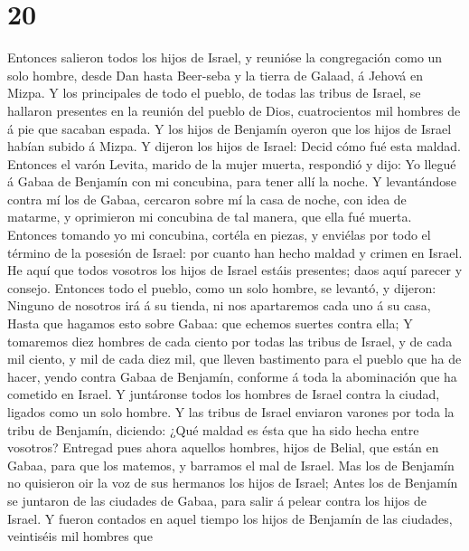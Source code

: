 \hypertarget{section-19}{%
\section{20}\label{section-19}}

 Entonces salieron todos los hijos de Israel, y reunióse
la congregación como un solo hombre, desde Dan hasta Beer-seba y la
tierra de Galaad, á Jehová en Mizpa.  Y los principales de
todo el pueblo, de todas las tribus de Israel, se hallaron presentes en
la reunión del pueblo de Dios, cuatrocientos mil hombres de á pie que
sacaban espada.  Y los hijos de Benjamín oyeron que los
hijos de Israel habían subido á Mizpa. Y dijeron los hijos de Israel:
Decid cómo fué esta maldad.  Entonces el varón Levita,
marido de la mujer muerta, respondió y dijo: Yo llegué á Gabaa de
Benjamín con mi concubina, para tener allí la noche.  Y
levantándose contra mí los de Gabaa, cercaron sobre mí la casa de noche,
con idea de matarme, y oprimieron mi concubina de tal manera, que ella
fué muerta.  Entonces tomando yo mi concubina, cortéla en
piezas, y enviélas por todo el término de la posesión de Israel: por
cuanto han hecho maldad y crimen en Israel.  He aquí que
todos vosotros los hijos de Israel estáis presentes; daos aquí parecer y
consejo.  Entonces todo el pueblo, como un solo hombre, se
levantó, y dijeron: Ninguno de nosotros irá á su tienda, ni nos
apartaremos cada uno á su casa,  Hasta que hagamos esto
sobre Gabaa: que echemos suertes contra ella;  Y
tomaremos diez hombres de cada ciento por todas las tribus de Israel, y
de cada mil ciento, y mil de cada diez mil, que lleven bastimento para
el pueblo que ha de hacer, yendo contra Gabaa de Benjamín, conforme á
toda la abominación que ha cometido en Israel.  Y
juntáronse todos los hombres de Israel contra la ciudad, ligados como un
solo hombre.  Y las tribus de Israel enviaron varones por
toda la tribu de Benjamín, diciendo: ¿Qué maldad es ésta que ha sido
hecha entre vosotros?  Entregad pues ahora aquellos
hombres, hijos de Belial, que están en Gabaa, para que los matemos, y
barramos el mal de Israel. Mas los de Benjamín no quisieron oir la voz
de sus hermanos los hijos de Israel;  Antes los de
Benjamín se juntaron de las ciudades de Gabaa, para salir á pelear
contra los hijos de Israel.  Y fueron contados en aquel
tiempo los hijos de Benjamín de las ciudades, veintiséis mil hombres que
